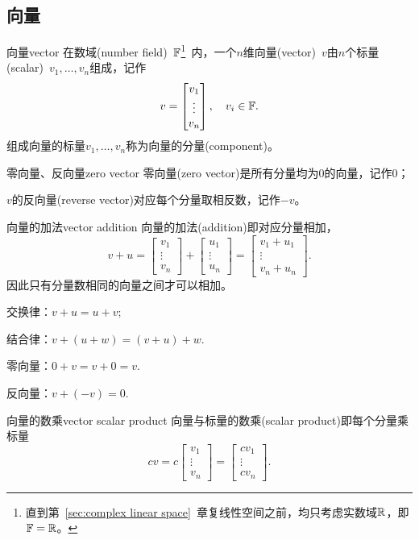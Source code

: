 \subsection{向量}
\begin{definition}{向量}{vector}
	在数域(number field)~$\mathbb F$\footnote{直到第~\ref{sec:complex linear space}~章复线性空间之前，均只考虑实数域$\mathbb R$，即$\mathbb F=\mathbb R$。}~内，一个$n$维向量(vector)~$v$由$n$个标量(scalar)~$v_1,\ldots,v_n$组成，记作
	\[
		v=\begin{bmatrix}
			v_1\\\vdots\\v_n
		\end{bmatrix},\quad v_i\in\mathbb F.
	\]
	组成向量的标量$v_1,\ldots,v_n$称为向量的分量(component)。
\end{definition}
\begin{definition}{零向量、反向量}{zero vector}
	零向量(zero vector)是所有分量均为0的向量，记作0；
	
	$v$的反向量(reverse vector)对应每个分量取相反数，记作$-v$。
\end{definition}
\begin{definition}{向量的加法}{vector addition}
	向量的加法(addition)即对应分量相加，
	\[
		v+u=\begin{bmatrix}
			v_1\\\vdots\\v_n
		\end{bmatrix}+\begin{bmatrix}
			u_1\\\vdots\\u_n
		\end{bmatrix}=\begin{bmatrix}
			v_1+u_1\\\vdots\\v_n+u_n
		\end{bmatrix}.
	\]
	因此只有分量数相同的向量之间才可以相加。
\end{definition}
\begin{compactitem}
	\item 交换律：$v+u=u+v;$
	\item 结合律：$v+(u+w)=(v+u)+w.$
	\item 零向量：$0+v=v+0=v.$
	\item 反向量：$v+(-v)=0.$
\end{compactitem}
\begin{definition}{向量的数乘}{vector scalar product}
	向量与标量的数乘(scalar product)即每个分量乘标量
	\[
		cv=c\begin{bmatrix}
			v_1\\\vdots\\v_n
		\end{bmatrix}=\begin{bmatrix}
			cv_1\\\vdots\\cv_n
		\end{bmatrix}.
	\]
\end{definition}
